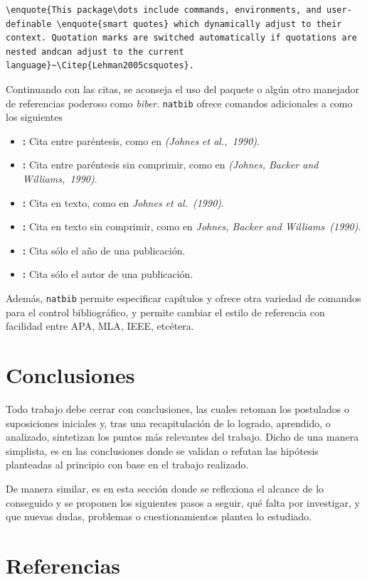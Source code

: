 \documentclass[letterpaper,10.5pt,twocolumn]{article}
\begin{document}
\begin{lstlisting}[language={[LaTex]{TeX}},label={lst:enquote},caption={Uso de enquote para entrecomillado de citas},captionpos=t]
\enquote{This package\dots include commands, environments, and user-definable \enquote{smart quotes} which dynamically adjust to their context. Quotation marks are switched automatically if quotations are nested andcan adjust to the current language}~\Citep{Lehman2005csquotes}.
\end{lstlisting}

Continuando con las citas, se aconseja el uso del paquete  o algún otro manejador de referencias poderoso como \emph{biber}.
\texttt{natbib} ofrece comandos adicionales a  como los siguientes~\citep{Daly2006natbib}
\begin{itemize}
	\item\textbf{:} Cita entre paréntesis, como en \emph{(Johnes et al.,~1990)}.
	\item\textbf{:} Cita entre paréntesis sin comprimir, como en \emph{(Johnes, Backer and Williams,~1990)}.
	\item\textbf{:} Cita en texto, como en \emph{Johnes et al.~(1990)}.
	\item\textbf{:} Cita en texto sin comprimir, como en \emph{Johnes, Backer and Williams~(1990)}.
	\item\textbf{:} Cita sólo el año de una publicación.
	\item\textbf{:} Cita sólo el autor de una publicación.
\end{itemize}

Además, \texttt{natbib} permite especificar capítulos y ofrece otra variedad de comandos para el control bibliográfico, y permite cambiar el estilo de referencia con facilidad entre APA, MLA, IEEE, etcétera.

\section{Conclusiones}
\label{sec:conclusions}
Todo trabajo debe cerrar con conclusiones, las cuales retoman los postulados o suposiciones iniciales y, tras una recapitulación de lo logrado, aprendido, o analizado, sintetizan los puntos más relevantes del trabajo.
Dicho de una manera simplista, es en las conclusiones donde se validan o refutan las hipótesis planteadas al principio con base en el trabajo realizado.

De manera similar, es en esta sección donde se reflexiona el alcance de lo conseguido y se proponen los siguientes pasos a seguir, qué falta por investigar, y que nuevas dudas, problemas o cuestionamientos plantea lo estudiado.

\section{Referencias}
\label{sec:references}
\nocite{*}


\end{document}
